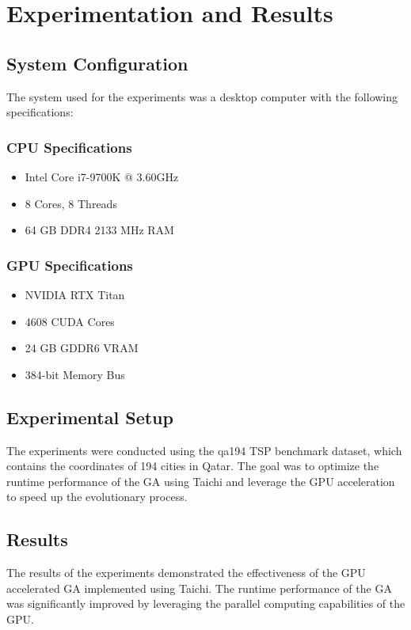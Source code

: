 \documentclass[conference]{IEEEtran}
\begin{document}
\section{Experimentation and Results}
\subsection{System Configuration}
The system used for the experiments was a desktop computer with the following
specifications:

\subsubsection{CPU Specifications}
\begin{itemize}
    \item Intel Core i7-9700K @ 3.60GHz
    \item 8 Cores, 8 Threads
    \item 64 GB DDR4 2133 MHz RAM
\end{itemize}

\subsubsection{GPU Specifications}
\begin{itemize}
    \item NVIDIA RTX Titan
    \item 4608 CUDA Cores
    \item 24 GB GDDR6 VRAM
    \item 384-bit Memory Bus
\end{itemize}

\subsection{Experimental Setup}
The experiments were conducted using the qa194 TSP benchmark dataset, which
contains the coordinates of 194 cities in Qatar. The goal was to optimize the
runtime performance of the GA using Taichi and leverage the GPU acceleration to
speed up the evolutionary process.

\subsection{Results}
The results of the experiments demonstrated the effectiveness of the GPU
accelerated GA implemented using Taichi. The runtime performance of the GA was
significantly improved by leveraging the parallel computing capabilities of the
GPU.
\end{document}
